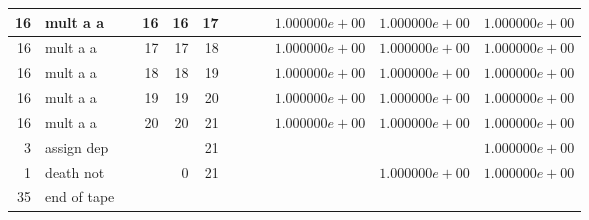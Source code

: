 \documentclass{article}
\begin{document}
\begin{tabular}{|r|l|r|r|r|r||r|r||r|r|r|r|}
16 & mult a a & & 16 & 16 & 17 & & & &$ 1.000000e+00 $&$ 1.000000e+00 $&$ 1.000000e+00 $\\ \hline 
16 & mult a a & & 17 & 17 & 18 & & & &$ 1.000000e+00 $&$ 1.000000e+00 $&$ 1.000000e+00 $\\ \hline 
16 & mult a a & & 18 & 18 & 19 & & & &$ 1.000000e+00 $&$ 1.000000e+00 $&$ 1.000000e+00 $\\ \hline 
16 & mult a a & & 19 & 19 & 20 & & & &$ 1.000000e+00 $&$ 1.000000e+00 $&$ 1.000000e+00 $\\ \hline 
16 & mult a a & & 20 & 20 & 21 & & & &$ 1.000000e+00 $&$ 1.000000e+00 $&$ 1.000000e+00 $\\ \hline 
3 & assign dep & & & & 21 & & & & & &$ 1.000000e+00 $\\ \hline 
1 & death not & & & 0 & 21 & & & & &$ 1.000000e+00 $&$ 1.000000e+00 $\\ \hline 
 35 & end of tape & & & & & & & & & &  \\ \hline 
\end{tabular}
\end{document}
